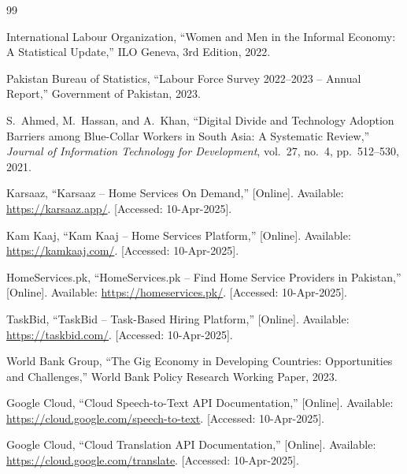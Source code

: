 \documentclass[12pt,a4paper]{report}
\begin{document}


\renewcommand\bibname{Bibliography}
\begin{thebibliography}{99}

International Labour Organization, ``Women and Men in the Informal Economy:
A Statistical Update,'' ILO Geneva, 3rd Edition, 2022.

Pakistan Bureau of Statistics, ``Labour Force Survey 2022--2023 -- Annual
Report,'' Government of Pakistan, 2023.

S.~Ahmed, M.~Hassan, and A.~Khan, ``Digital Divide and Technology Adoption
Barriers among Blue-Collar Workers in South Asia: A Systematic Review,''
\textit{Journal of Information Technology for Development}, vol.~27, no.~4,
pp.~512--530, 2021.

Karsaaz, ``Karsaaz -- Home Services On Demand,'' [Online]. Available:
\url{https://karsaaz.app/}. [Accessed: 10-Apr-2025].

Kam Kaaj, ``Kam Kaaj -- Home Services Platform,'' [Online]. Available:
\url{https://kamkaaj.com/}. [Accessed: 10-Apr-2025].

HomeServices.pk, ``HomeServices.pk -- Find Home Service Providers in Pakistan,''
[Online]. Available: \url{https://homeservices.pk/}. [Accessed: 10-Apr-2025].

TaskBid, ``TaskBid -- Task-Based Hiring Platform,'' [Online]. Available:
\url{https://taskbid.com/}. [Accessed: 10-Apr-2025].

World Bank Group, ``The Gig Economy in Developing Countries: Opportunities and
Challenges,'' World Bank Policy Research Working Paper, 2023.

Google Cloud, ``Cloud Speech-to-Text API Documentation,'' [Online]. Available:
\url{https://cloud.google.com/speech-to-text}. [Accessed: 10-Apr-2025].

Google Cloud, ``Cloud Translation API Documentation,'' [Online]. Available:
\url{https://cloud.google.com/translate}. [Accessed: 10-Apr-2025].

\end{thebibliography}
\end{document}
